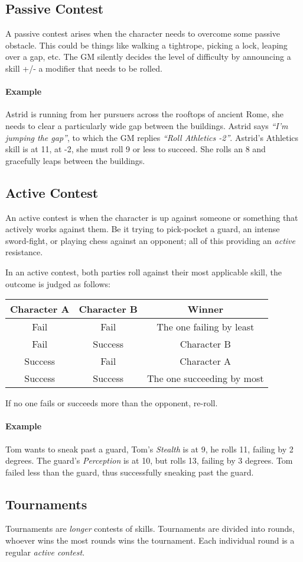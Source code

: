\subsection{Passive Contest}
A passive contest arises when the character needs to overcome some passive obstacle. This could be things like walking a tightrope, picking a lock, leaping over a gap, etc.
The GM silently decides the level of difficulty by announcing a skill +/- a modifier that needs to be rolled.

\paragraph{Example} Astrid is running from her pursuers across the rooftops of ancient Rome, she needs to clear a particularly wide gap between the buildings. Astrid says \textit{``I'm jumping the gap''}, to which the GM replies \textit{``Roll Athletics -2''}. Astrid's Athletics skill is at 11, at -2, she must roll 9 or less to succeed. She rolls an 8 and gracefully leaps between the buildings.

\subsection{Active Contest}
An active contest is when the character is up against someone or something that actively works against them. Be it trying to pick-pocket a guard, an intense sword-fight, or playing chess against an opponent; all of this providing an \textit{active} resistance.

In an active contest, both parties roll against their most applicable skill, the outcome is judged as follows:

\begin{center}
    \begin{tabular}{c|c|c}
    \textbf{Character A} & \textbf{Character B} & \textbf{Winner}\\\hline
    Fail & Fail & The one failing by least \\
    Fail & Success & Character B \\
    Success & Fail & Character A \\
    Success & Success & The one succeeding by most
    \end{tabular}
\end{center}
If no one fails or succeeds more than the opponent, re-roll.

\paragraph{Example} Tom wants to sneak past a guard, Tom's \textit{Stealth} is at 9, he rolls 11, failing by 2 degrees. 
The guard's \textit{Perception} is at 10, but rolls 13, failing by 3 degrees. 
Tom failed less than the guard, thus successfully sneaking past the guard.

\subsection{Tournaments}
Tournaments are \textit{longer} contests of skills.
Tournaments are divided into rounds, whoever wins the most rounds wins the tournament.
Each individual round is a regular \textit{active contest}.
